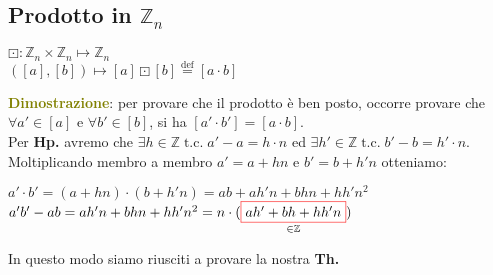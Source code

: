 \subsection{Prodotto in $\mathbb{Z}_n$}

{\centering
    $\boxdot : \mathbb{Z}_n \times \mathbb{Z}_n \mapsto \mathbb{Z}_n$ \\
    $([a], [b]) \mapsto [a] \boxdot [b] \overset{\text{def}}{=} [a \cdot b]$
\par}

\begin{boxA}
    \textcolor{olive}{\textbf{Dimostrazione}}: per provare che il prodotto è ben posto, occorre provare che $\forall a' \in [a]$ e $\forall b' \in [b]$, si ha $[a' \cdot b'] = [a \cdot b]$. \\
    Per \textbf{Hp.} avremo che $\exists h \in \mathbb{Z} \; \text{t.c.} \; a' - a = h \cdot n$ ed $\exists h' \in \mathbb{Z} \; \text{t.c.} \; b' - b = h' \cdot n$. Moltiplicando membro a membro $a' = a + hn$ e $b' = b + h'n$ otteniamo:

    {\centering
        $a' \cdot b' = (a + hn) \cdot (b + h'n) = ab + ah'n + bhn + hh'n^2$ \\
        $a'b' - ab = ah'n + bhn + hh'n^2 = n \cdot (\underset{\in \mathbb{Z}}{\fcolorbox{red}{white}{$ah' + bh + hh'n$}})$
    \par}
    In questo modo siamo riusciti a provare la nostra \textbf{Th.}
\end{boxA}

